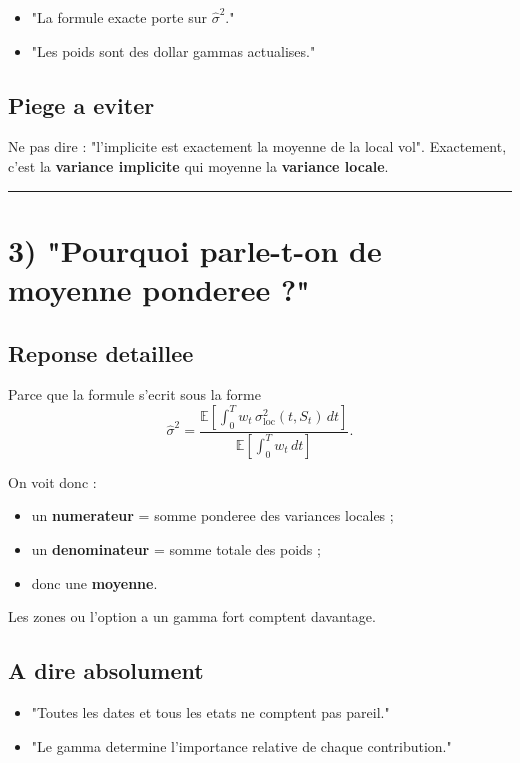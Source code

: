 \documentclass[11pt,a4paper]{article}
\begin{document}
\begin{itemize}
\item "La formule exacte porte sur \(\hat{\sigma}^2\)."
\item "Les poids sont des dollar gammas actualises."
\end{itemize}

\subsection{Piege a eviter}

Ne pas dire : "l'implicite est exactement la moyenne de la local vol".  
Exactement, c'est la \textbf{variance implicite} qui moyenne la \textbf{variance locale}.

\bigskip\hrule\bigskip

\section{3) "Pourquoi parle-t-on de moyenne ponderee ?"}

\subsection{Reponse detaillee}

Parce que la formule s'ecrit sous la forme
\[
\hat{\sigma}^2
=
\frac{\mathbb E\left[\int_0^T w_t\,\sigma_{\mathrm{loc}}^2(t,S_t)\,dt\right]}
{\mathbb E\left[\int_0^T w_t\,dt\right]}.
\]

On voit donc :

\begin{itemize}
\item un \textbf{numerateur} = somme ponderee des variances locales ;
\item un \textbf{denominateur} = somme totale des poids ;
\item donc une \textbf{moyenne}.
\end{itemize}

Les zones ou l'option a un gamma fort comptent davantage.

\subsection{A dire absolument}

\begin{itemize}
\item "Toutes les dates et tous les etats ne comptent pas pareil."
\item "Le gamma determine l'importance relative de chaque contribution."
\end{itemize}
\end{document}

